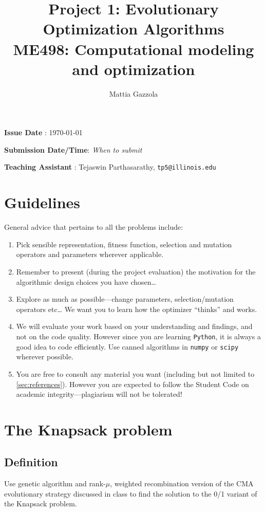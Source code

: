 \documentclass[11pt]{article}
\author{Mattia Gazzola}
\date{}
\title{Project 1: Evolutionary Optimization Algorithms\\\medskip
\large ME498: Computational modeling and optimization}
\begin{document}
\maketitle
\textbf{Issue Date} : \today

\textbf{Submission Date/Time}: \emph{When to submit}

\textbf{Teaching Assistant} : Tejaswin Parthasarathy, \texttt{tp5@illinois.edu}

\section{Guidelines}
\label{sec:org615e5a1}
General advice that pertains to all the problems include:
\begin{enumerate}
\item Pick sensible representation, fitness function, selection and mutation
operators and parameters wherever applicable.
\item Remember to present (during the project evaluation) the motivation for the
algorithmic design choices you have chosen\ldots{}
\item Explore as much as possible---change parameters, selection/mutation
operators etc\ldots{} We want you to learn how the optimizer ``thinks'' and works.
\item We will evaluate your work based on your understanding and findings, and
not on the code quality. However since you are learning \texttt{Python}, it is
always a good idea to code efficiently. Use canned algorithms in \texttt{numpy} or
\texttt{scipy} wherever possible.
\item You are free to consult any material you want (including but not limited to
\cref{sec:references}). However you are expected to follow the Student Code
on academic integrity---plagiarism will not be tolerated!
\end{enumerate}

\section{The Knapsack problem}
\label{sec:orga486aea}
\subsection{Definition}
\label{sec:org6f2256a}
  Use genetic algorithm and rank-\(\mu\), weighted recombination version of the CMA
evolutionary strategy discussed in class to find the solution to the 0/1 variant of
the Knapsack problem.
\end{document}
